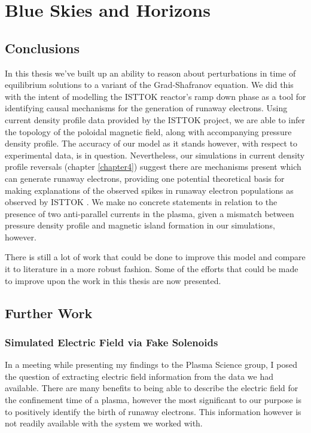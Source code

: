 
\chapter{Blue Skies and Horizons}
\label{chapter6}

\section{Conclusions}

In this thesis we've built up an ability to reason about perturbations in time of 
equilibrium solutions to a variant of the Grad-Shafranov equation. We did this with the intent 
of modelling the ISTTOK reactor's ramp down phase as a tool for identifying 
causal mechanisms for the generation of runaway electrons. Using current density profile data provided by the ISTTOK project, we are able to infer the topology of the poloidal magnetic field, 
along with accompanying pressure density profile. The accuracy of our model as it stands however, with respect to experimental data,
is in question. Nevertheless, our simulations in current density profile reversals (chapter \ref{chapter4}) suggest there are mechanisms present which can 
generate runaway electrons, providing one potential theoretical basis for making explanations of the observed spikes 
in runaway electron populations as observed by ISTTOK \cite{malaquias-matthew}. We make no concrete statements in relation to the presence of two anti-parallel 
currents in the plasma, given a mismatch between pressure density profile and magnetic island formation in our simulations, however.

There is still a lot of work that could be done to improve this 
model and compare it to literature in a more robust fashion. Some of the efforts that 
could be made to improve upon the work in this thesis are now presented.

\section{Further Work}

\subsection{Simulated Electric Field via Fake Solenoids}

In a meeting while presenting my findings to the Plasma Science group, I 
posed the question of extracting electric field information from the data 
we had available. There are many benefits to being able to describe the 
electric field for the confinement time of a plasma, however the 
most significant to our purpose is to positively identify the 
birth of runaway electrons. This information however is not readily 
available with the system we worked with.

